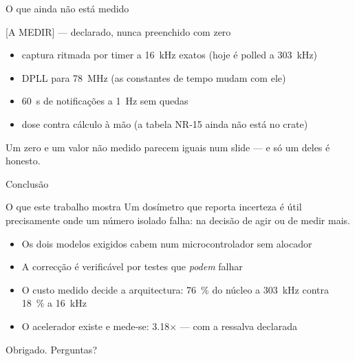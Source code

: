 \documentclass[aspectratio=169,10pt]{beamer}
\begin{document}
\begin{frame}{O que ainda não está medido}
  \begin{alertblock}{[A MEDIR] — declarado, nunca preenchido com zero}
    \begin{itemize}
      \item captura ritmada por timer a \SI{16}{kHz} exatos (hoje é polled a \SI{303}{kHz})
      \item DPLL para \SI{78}{MHz} (as constantes de tempo mudam com ele)
      \item \SI{60}{s} de notificações a \SI{1}{Hz} sem quedas
      \item dose contra cálculo à mão (a tabela NR-15 ainda não está no crate)
    \end{itemize}
  \end{alertblock}
  \vspace{0.3cm}
  \footnotesize Um zero e um valor não medido parecem iguais num slide — e só um deles é honesto.
\end{frame}

\begin{frame}{Conclusão}
  \begin{block}{O que este trabalho mostra}
    Um dosímetro que reporta incerteza é útil precisamente onde um número isolado falha:
    na decisão de agir ou de medir mais.
  \end{block}
  \begin{itemize}
    \item Os dois modelos exigidos cabem num microcontrolador sem alocador
    \item A correcção é verificável por testes que \emph{podem} falhar
    \item O custo medido decide a arquitectura: \SI{76}{\percent} do núcleo a \SI{303}{kHz}
          contra \SI{18}{\percent} a \SI{16}{kHz}
    \item O acelerador existe e mede-se: \num{3.18}× — com a ressalva declarada
  \end{itemize}
  \vspace{0.3cm}
  \centering \small Obrigado. Perguntas?
\end{frame}
\end{document}
